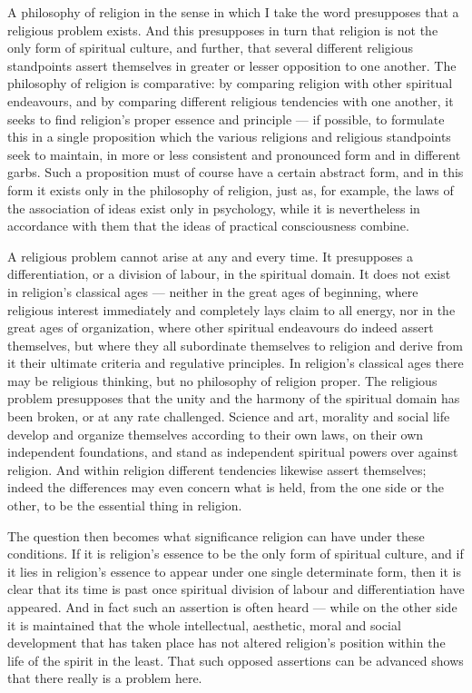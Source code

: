 \documentclass[12pt,a4paper]{article}
\newcommand{\opage}[1]{\marginnote{\footnotesize\textit{[#1]}}}
\begin{document}
A philosophy of religion in the sense in which I take the word presupposes that
a religious problem exists. And this presupposes in turn that religion is not
the only form of spiritual culture, and further, that several different
religious standpoints assert themselves in greater or lesser opposition to one
another. The philosophy of religion is comparative: by comparing religion with
other spiritual endeavours, and by comparing different religious tendencies
with one another, it seeks to find religion's proper essence and principle ---
if possible, to formulate this in a single proposition which the various
religions and religious standpoints seek to maintain, in more or less
consistent and pronounced form and in different garbs. Such a proposition must
of course have a certain abstract form, and in this form it exists only in the
philosophy of religion, just as, for example, the laws of the association of
ideas exist only in psychology, while it is nevertheless in accordance with
them that the ideas of practical consciousness combine.

A religious problem cannot arise at any and every time. It presupposes a
differentiation, or a division of labour, in the spiritual domain. It does not
exist in religion's classical ages --- neither in the great ages of beginning,
where religious interest immediately and completely lays claim to all energy,
nor in the great ages of organization, where other spiritual endeavours do
indeed assert themselves, but where they all subordinate themselves to religion
and derive from it their ultimate criteria and regulative principles. In
religion's classical ages there may be religious thinking, but no philosophy of
religion proper. The religious problem presupposes that the unity and the
harmony of the spiritual domain has been broken, or at any rate challenged.
Science and art, morality and social life develop and organize themselves
according to their own laws, on their own independent foundations, and stand as
independent spiritual powers over against religion. And within \opage{413}religion
different tendencies likewise assert themselves; indeed the differences may
even concern what is held, from the one side or the other, to be the essential
thing in religion.

The question then becomes what significance religion can have under these
conditions. If it is religion's essence to be the only form of spiritual
culture, and if it lies in religion's essence to appear under one single
determinate form, then it is clear that its time is past once spiritual
division of labour and differentiation have appeared. And in fact such an
assertion is often heard --- while on the other side it is maintained that the
whole intellectual, aesthetic, moral and social development that has taken
place has not altered religion's position within the life of the spirit in the
least. That such opposed assertions can be advanced shows that there really is
a problem here.
\end{document}
